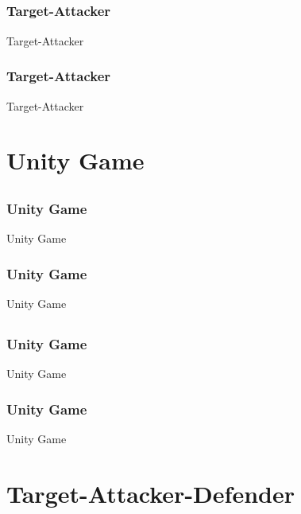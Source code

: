 \documentclass{beamer}
\begin{document}
\subsection{} 
\begin{frame}
\frametitle{Target-Attacker}
Target-Attacker
\end{frame}
\begin{frame}
\frametitle{Target-Attacker}
Target-Attacker
\end{frame}

\section{Unity Game}

\subsection{}
\begin{frame}
\frametitle{Unity Game}
Unity Game
\end{frame}
\begin{frame}
\frametitle{Unity Game}
Unity Game
\end{frame}

\subsection{}
\begin{frame}
\frametitle{Unity Game}
Unity Game
\end{frame}
\begin{frame}
\frametitle{Unity Game}
Unity Game
\end{frame}


\section{Target-Attacker-Defender}
\end{document}
